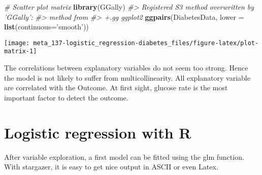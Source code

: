 \documentclass[]{book}
\newenvironment{Shaded}{\begin{snugshade}}{\end{snugshade}}
\newcommand{\CommentTok}[1]{\textcolor[rgb]{0.56,0.35,0.01}{\textit{#1}}}
\newcommand{\DataTypeTok}[1]{\textcolor[rgb]{0.13,0.29,0.53}{#1}}
\newcommand{\KeywordTok}[1]{\textcolor[rgb]{0.13,0.29,0.53}{\textbf{#1}}}
\newcommand{\NormalTok}[1]{#1}
\newcommand{\StringTok}[1]{\textcolor[rgb]{0.31,0.60,0.02}{#1}}
\begin{document}
\begin{Shaded}
\begin{Highlighting}[]
\CommentTok{# Scatter plot matrix}
\KeywordTok{library}\NormalTok{(GGally)}
\CommentTok{#> Registered S3 method overwritten by 'GGally':}
\CommentTok{#>   method from   }
\CommentTok{#>   +.gg   ggplot2}
\KeywordTok{ggpairs}\NormalTok{(DiabetesData, }\DataTypeTok{lower =} \KeywordTok{list}\NormalTok{(}\DataTypeTok{continuous=}\StringTok{'smooth'}\NormalTok{))}
\end{Highlighting}
\end{Shaded}

\begin{center}\texttt{[image: meta\_137-logistic\_regression-diabetes\_files/figure-latex/plot-matrix-1]} \end{center}

The correlations between explanatory variables do not seem too strong. Hence the model is not likely to suffer from multicollinearity. All explanatory variable are correlated with the Outcome. At first sight, glucose rate is the most important factor to detect the outcome.

\hypertarget{logistic-regression-with-r}{%
\section{Logistic regression with R}\label{logistic-regression-with-r}}

After variable exploration, a first model can be fitted using the glm function. With stargazer, it is easy to get nice output in ASCII or even Latex.
\end{document}
